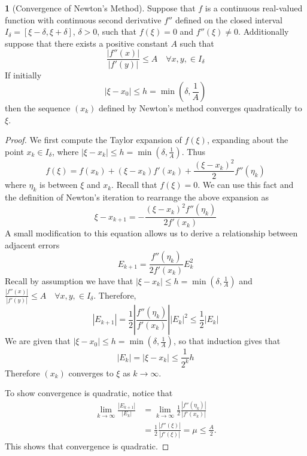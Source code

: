 \documentclass[12pt]{article}
\theoremstyle{definition}
\newtheorem{theorem}{\color{ForestGreen}{\textbf{Theorem}}}
\theoremstyle{definition}
\begin{document}
\begin{theorem}[Convergence of Newton's Method]
Suppose that $f$ is a continuous real-valued function with continuous second derivative $f''$ defined on the closed interval $I_\delta = [\xi - \delta, \xi + \delta]$, $\delta > 0$, such that $f(\xi) = 0$ and $f''(\xi) \neq 0$. Additionally suppose that there exists a positive constant $A$ such that 
\begin{equation}
	\frac{|f''(x)|}{|f'(y)|} \leq A \quad \forall x,y, \in I_\delta
\end{equation}
If initially
\begin{equation}
	|\xi - x_0| \leq h = \min(\delta, \frac{1}{A})
\end{equation}
then the sequence $(x_k)$ defined by Newton's method converges quadratically to $\xi$. 
\end{theorem}

\begin{proof}
We first compute the Taylor expansion of $f(\xi)$, expanding about the point $x_k \in I_\delta$, where $|\xi - x_k| \leq h = \min(\delta, \frac{1}{A})$. Thus
\begin{equation}
	f(\xi) = f(x_k) + (\xi - x_k)f'(x_k) + \frac{(\xi - x_k)^2}{2} f''(\eta_k)
\end{equation}
where $\eta_k$ is between $\xi$ and $x_k$. Recall that $f(\xi) = 0$. We can use this fact and the definition of Newton's iteration to rearrange the above expansion as
\begin{equation}
	\xi - x_{k+1} = - \frac{(\xi - x_k)^2 f''(\eta_k) }{2f'(x_k)}
\end{equation}
A small modification to this equation allows us to derive a relationship between adjacent errors
\begin{equation}
	E_{k+1} = \frac{f''(\eta_k)}{2f'(x_k)} E_k^2
\end{equation}
Recall by assumption we have that $|\xi - x_k| \leq h = \min(\delta, \frac{1}{A})$ and $\frac{|f''(x)|}{|f'(y)|} \leq A \quad \forall x,y, \in I_\delta$. Therefore, 
\begin{equation}
 	|E_{k+1}| = \frac{1}{2} \left\vert \frac{f''(\eta_k)}{f'(x_k)} \right\vert |E_k|^2 \leq \frac{1}{2} |E_k|
\end{equation} 
We are given that $|\xi - x_0| \leq h = \min(\delta, \frac{1}{A})$, so that induction gives that 
\begin{equation}
	|E_k| = |\xi - x_k| \leq \frac{1}{2^k} h
\end{equation}
Therefore $(x_k)$ converges to $\xi$ as $k \to \infty$. 


To show convergence is quadratic, notice that
\begin{align*}
	\lim_{k \to \infty} \frac{|E_{k+1}|}{|E_k|} &= \lim_{k \to \infty} \frac{1}{2} \frac{|f''(\eta_k)|}{|f'(x_k)|} \\
	&= \frac{1}{2} \frac{|f''(\xi)|}{|f'(\xi)|} = \mu \leq \frac{A}{2}. 
\end{align*}
This shows that convergence is quadratic. 
\end{proof}
\end{document}
